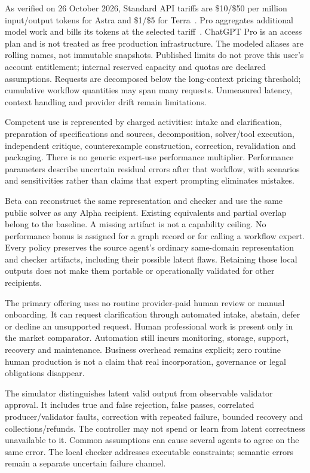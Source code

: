 \documentclass[11pt,letterpaper]{article}
\newcommand{\usd}[1]{\$#1}
\begin{document}
As verified on 26 October 2026, Standard API tariffs are \usd{10}/\usd{50} per million input/output tokens for Astra and \usd{1}/\usd{5} for Terra~\cite{Astra,Terra}. Pro aggregates additional model work and bills its tokens at the selected tariff~\cite{Latest}. ChatGPT Pro is an access plan and is not treated as free production infrastructure. The modeled aliases are rolling names, not immutable snapshots. Published limits do not prove this user's account entitlement; internal reserved capacity and quotas are declared assumptions. Requests are decomposed below the long-context pricing threshold; cumulative workflow quantities may span many requests. Unmeasured latency, context handling and provider drift remain limitations.

Competent use is represented by charged activities: intake and clarification, preparation of specifications and sources, decomposition, solver/tool execution, independent critique, counterexample construction, correction, revalidation and packaging. There is no generic expert-use performance multiplier. Performance parameters describe uncertain residual errors after that workflow, with scenarios and sensitivities rather than claims that expert prompting eliminates mistakes.

Beta can reconstruct the same representation and checker and use the same public solver as any Alpha recipient. Existing equivalents and partial overlap belong to the baseline. A missing artifact is not a capability ceiling. No performance bonus is assigned for a graph record or for calling a workflow expert. Every policy preserves the source agent's ordinary same-domain representation and checker artifacts, including their possible latent flaws. Retaining those local outputs does not make them portable or operationally validated for other recipients.

The primary offering uses no routine provider-paid human review or manual onboarding. It can request clarification through automated intake, abstain, defer or decline an unsupported request. Human professional work is present only in the market comparator. Automation still incurs monitoring, storage, support, recovery and maintenance. Business overhead remains explicit; zero routine human production is not a claim that real incorporation, governance or legal obligations disappear.

The simulator distinguishes latent valid output from observable validator approval. It includes true and false rejection, false passes, correlated producer/validator faults, correction with repeated failure, bounded recovery and collections/refunds. The controller may not spend or learn from latent correctness unavailable to it. Common assumptions can cause several agents to agree on the same error. The local checker addresses executable constraints; semantic errors remain a separate uncertain failure channel.
\end{document}
